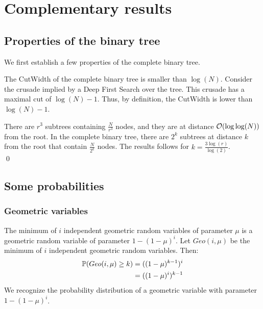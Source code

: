 \appendix
\section{Complementary results}

\subsection{Properties of the binary tree}
We first establish a few properties of the complete binary tree.

\begin{proposition} \label{cl:Wtree} 
The {\sc CutWidth} of the complete binary tree is smaller than $\log(N)$.
\proof Consider the crusade \cite{Drakopoulos2015} implied by a Deep First Search over the tree. This crusade has a maximal cut of $\log(N) - 1$. Thus, by definition, the {\sc CutWidth} is lower than $\log(N) - 1$.

\end{proposition}

\begin{proposition} \label{cl:Nsubtrees} 
There are $r^3$ subtrees containing $\frac{N}{r^3}$ nodes, and they are at distance $\mathcal{O}(\log\log(N))$ from the root.
\proof In the complete binary tree, there are $2^k$ subtrees at distance $k$ from the root that contain $\frac{N}{2^k}$ nodes. The results follows for $k = \frac{3\log(r)}{\log(2)}$. \\\qed 
\end{proposition}




\subsection{Some probabilities}

\subsubsection{Geometric variables}
\begin{proposition} \label{cl:minGeo} 
The minimum of $i$ independent geometric random variables of parameter $\mu$ is a geometric random variable of parameter $1 - (1-\mu)^i$.
\proof Let $Geo(i,\mu)$ be the minimum of $i$ independent geometric random variables. Then:
\begin{align*}
\mathbb{P}(Geo(i,\mu) \geq k) &= ((1 - \mu)^{k-1})^i \\
&= ((1 - \mu)^i)^{k-1}
\end{align*}
We recognize the probability distribution of a geometric variable with parameter $1 - (1-\mu)^i$.
\end{proposition}


